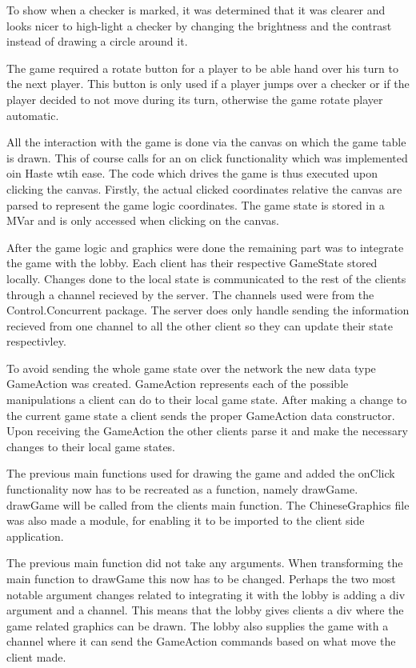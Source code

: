 \documentclass[a4paper]{article}
\begin{document}
To show when a checker is marked, it was determined that it was clearer and looks nicer to high-light a checker by changing the brightness and the contrast instead of drawing a circle around it.

The game required a rotate button for a player to be able hand over his turn to the next player. This button is only used if a player jumps over a checker or if the player decided to not move during its turn, otherwise the game rotate player automatic.

All the interaction with the game is done via the canvas on which the game table is drawn. This of course calls for an on click functionality which was
implemented oin Haste wtih ease. The code which drives the game is thus executed upon clicking the canvas. Firstly, the actual clicked coordinates relative the canvas are parsed to represent the game logic coordinates. The game state is stored in a MVar and is only accessed when clicking on the canvas.

After the game logic and graphics were done the remaining part was to integrate the game with the lobby. Each client has their respective GameState stored locally. Changes done to the local state is communicated to the rest of the clients through a channel recieved by the server. The channels used were from the Control.Concurrent package. The server does only handle sending the information recieved from one channel to all the other client so they can update their state respectivley.

To avoid sending the whole game state over the network the new data type GameAction was created. GameAction represents each of the possible manipulations a client can do to their local game state. After making a change to the current game state a client sends the proper GameAction data constructor. Upon receiving the GameAction the other clients parse it and make the necessary changes to their local game states.

The previous main functions used for drawing the game and added the onClick functionality now has to be recreated as a function, namely drawGame. drawGame will be called from the clients main function. The ChineseGraphics file was also
made a module, for enabling it to be imported to the client side application. 

The previous main function did not take any arguments. When transforming the main function to drawGame this now has to be changed. Perhaps the two most notable argument changes related to integrating it with the lobby is
adding a div argument and a channel. This means that the lobby gives clients a div where the game related graphics can be drawn. The lobby also supplies the game with a channel where it can send the GameAction commands based on what move the client made.
\end{document}
